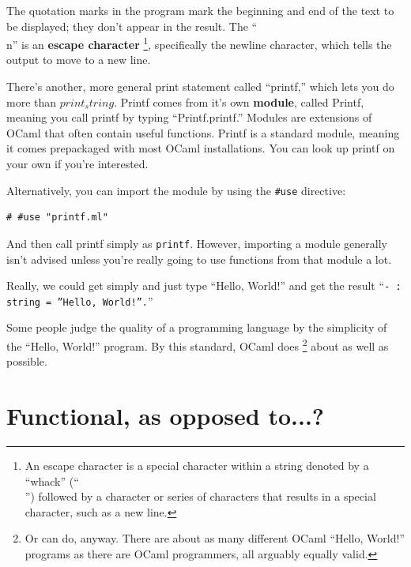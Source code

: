 \documentclass[10pt]{book}
\begin{document}
The quotation marks in the program mark the beginning and end of the text to be displayed; they 
don't appear in the result. The ``\\n'' is an {\bf escape character} \footnote{An escape character 
is a special character within a string denoted by a ``whack'' (``\\'') followed by a character or 
series of characters that results in a special character, such as a new line.}, specifically the 
newline character, which tells the output to move to a new line.


There's another, more general print statement called ``printf,'' which lets you do more than $print_string$.
Printf comes from it's own {\bf module}, called Printf, meaning you call printf by typing ``Printf.printf.''
Modules are extensions of OCaml that often contain useful functions. Printf is a standard module, meaning
it comes prepackaged with most OCaml installations. You can look up printf on your own if you're interested.

Alternatively, you can import the module by using the \verb"#use" directive:

\beforeverb
\begin{verbatim}
# #use "printf.ml"
\end{verbatim}
\afterverb
%
And then call printf simply as {\tt printf}. However, importing a module generally isn't advised  unless you're
really going to use functions from that module a lot.


Really, we could get simply and just type ``Hello, World!'' and get the result ``{\tt - : string = ''Hello, World!''.}''

Some people judge the quality of a programming language by the simplicity of the ``Hello, World!'' program.  By this 
standard, OCaml does \footnote{Or can do, anyway. There are about as many different OCaml ``Hello, World!'' programs 
as there are OCaml programmers, all arguably equally valid.} about as well as possible.

\section{Functional, as opposed to...?}

\end{document}
